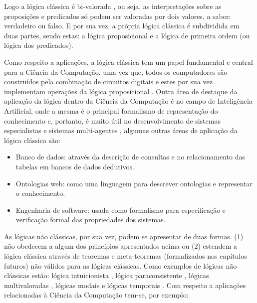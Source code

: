 Logo a lógica clássica é bi-valorada \cite{edgar2002}, ou seja, as interpretações sobre as proposições e predicados só podem ser valoradas por dois valores, a saber: verdadeiro ou falso. E por sua vez, a própria lógica clássica é subdividida em duas partes, sendo estas: a lógica proposicional e a lógica de primeira ordem (ou lógica dos predicados).

Como respeito a aplicações, a lógica clássica tem um papel fundamental e central para a Ciência da Computação, uma vez que, todos os computadores são construídos pela combinação de circuitos digitais e estes por sua vez implementam operações da lógica proposicional \cite{abe2002-logica, nunes2008}. Outra área de destaque da aplicação da lógica dentro da Ciência da Computação é no campo de Inteligência Artificial, onde a mesma é o principal formalismo de representação do conhecimento e, portanto, é muito útil no desenvolvimento de sistemas especialistas e sistemas multi-agentes \cite{benja-Logica}, algumas outras áreas de aplicação da lógica clássica são:

\begin{itemize}
	\item Banco de dados: através da descrição de consultas e no relacionamento das
tabelas em bancos de dados dedutivos.
	\item Ontologias web: como uma linguagem para descrever
ontologias e representar o conhecimento.
	\item Engenharia de software: usada como formalismo para especificação e verificação formal das propriedades dos sistemas.
\end{itemize}

As lógicas não clássicas, por sua vez, podem se apresentar de duas formas. (1) não obedecem a algum dos princípios apresentados acima ou (2) estendem a lógica clássica através de teoremas e meta-teoremas (formalizados nos capítulos futuros) não válidos para as lógicas clássicas. Como exemplos de lógicas não clássicas estão: lógica intuicionista \cite{lungarzo1972}, lógica paraconsistente \cite{da2008logica}, lógicas multivaloradas \cite{benja-Logica, magnus2020}, lógicas modais \cite{magnus2020} e lógicas temporais \cite{halpern1983, harel1979, manna1979}. Com respeito a aplicações relacionadas à Ciência da Computação tem-se, por exemplo:


